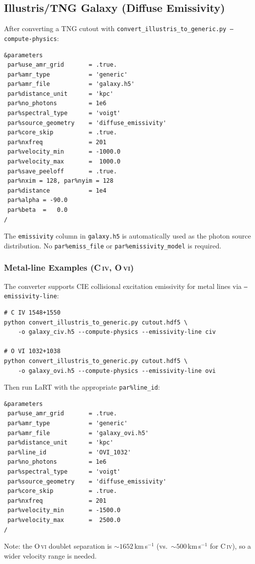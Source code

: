 \documentclass[english,a4paper]{my_memo}
\begin{document}
\subsection{Illustris/TNG Galaxy (Diffuse Emissivity)}

After converting a TNG cutout with
\texttt{convert\_illustris\_to\_generic.py --compute-physics}:

\begin{lstlisting}
&parameters
 par%use_amr_grid       = .true.
 par%amr_type           = 'generic'
 par%amr_file           = 'galaxy.h5'
 par%distance_unit      = 'kpc'
 par%no_photons         = 1e6
 par%spectral_type      = 'voigt'
 par%source_geometry    = 'diffuse_emissivity'
 par%core_skip          = .true.
 par%nxfreq             = 201
 par%velocity_min       = -1000.0
 par%velocity_max       =  1000.0
 par%save_peeloff       = .true.
 par%nxim = 128, par%nyim = 128
 par%distance           = 1e4
 par%alpha = -90.0
 par%beta  =   0.0
/
\end{lstlisting}

The \texttt{emissivity} column in \texttt{galaxy.h5} is automatically
used as the photon source distribution.  No \texttt{par\%emiss\_file}
or \texttt{par\%emissivity\_model} is required.

\subsubsection*{Metal-line Examples (C\,\textsc{iv}, O\,\textsc{vi})}

The converter supports CIE collisional excitation emissivity for metal
lines via \texttt{--emissivity-line}:

\begin{lstlisting}[language={}]
# C IV 1548+1550
python convert_illustris_to_generic.py cutout.hdf5 \
    -o galaxy_civ.h5 --compute-physics --emissivity-line civ

# O VI 1032+1038
python convert_illustris_to_generic.py cutout.hdf5 \
    -o galaxy_ovi.h5 --compute-physics --emissivity-line ovi
\end{lstlisting}

Then run LaRT with the appropriate \texttt{par\%line\_id}:

\begin{lstlisting}
&parameters
 par%use_amr_grid       = .true.
 par%amr_type           = 'generic'
 par%amr_file           = 'galaxy_ovi.h5'
 par%distance_unit      = 'kpc'
 par%line_id            = 'OVI_1032'
 par%no_photons         = 1e6
 par%spectral_type      = 'voigt'
 par%source_geometry    = 'diffuse_emissivity'
 par%core_skip          = .true.
 par%nxfreq             = 201
 par%velocity_min       = -1500.0
 par%velocity_max       =  2500.0
/
\end{lstlisting}

Note: the O\,\textsc{vi} doublet separation is $\sim 1652$\,km\,s$^{-1}$
(vs.\ $\sim 500$\,km\,s$^{-1}$ for C\,\textsc{iv}), so a wider velocity
range is needed.
\end{document}
